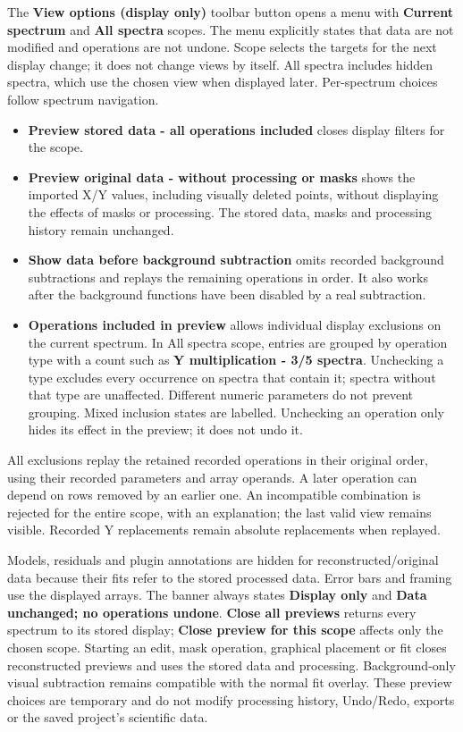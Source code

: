 \documentclass[
  10pt,
  a4paper,
  oneside]{scrreprt}
\providecommand{\tightlist}{%
  \setlength{\itemsep}{0pt}\setlength{\parskip}{0pt}}
\begin{document}
The \textbf{View options (display only)} toolbar button opens a menu
with \textbf{Current spectrum} and \textbf{All spectra} scopes. The menu
explicitly states that data are not modified and operations are not
undone. Scope selects the targets for the next display change; it does
not change views by itself. All spectra includes hidden spectra, which
use the chosen view when displayed later. Per-spectrum choices follow
spectrum navigation.

\begin{itemize}
\tightlist
\item
  \textbf{Preview stored data - all operations included} closes display
  filters for the scope.
\item
  \textbf{Preview original data - without processing or masks} shows the
  imported X/Y values, including visually deleted points, without
  displaying the effects of masks or processing. The stored data, masks
  and processing history remain unchanged.
\item
  \textbf{Show data before background subtraction} omits recorded
  background subtractions and replays the remaining operations in order.
  It also works after the background functions have been disabled by a
  real subtraction.
\item
  \textbf{Operations included in preview} allows individual display
  exclusions on the current spectrum. In All spectra scope, entries are
  grouped by operation type with a count such as \textbf{Y
  multiplication - 3/5 spectra}. Unchecking a type excludes every
  occurrence on spectra that contain it; spectra without that type are
  unaffected. Different numeric parameters do not prevent grouping.
  Mixed inclusion states are labelled. Unchecking an operation only
  hides its effect in the preview; it does not undo it.
\end{itemize}

All exclusions replay the retained recorded operations in their original
order, using their recorded parameters and array operands. A later
operation can depend on rows removed by an earlier one. An incompatible
combination is rejected for the entire scope, with an explanation; the
last valid view remains visible. Recorded Y replacements remain absolute
replacements when replayed.

Models, residuals and plugin annotations are hidden for
reconstructed/original data because their fits refer to the stored
processed data. Error bars and framing use the displayed arrays. The
banner always states \textbf{Display only} and \textbf{Data unchanged;
no operations undone}. \textbf{Close all previews} returns every
spectrum to its stored display; \textbf{Close preview for this scope}
affects only the chosen scope. Starting an edit, mask operation,
graphical placement or fit closes reconstructed previews and uses the
stored data and processing. Background-only visual subtraction remains
compatible with the normal fit overlay. These preview choices are
temporary and do not modify processing history, Undo/Redo, exports or
the saved project's scientific data.
\end{document}
